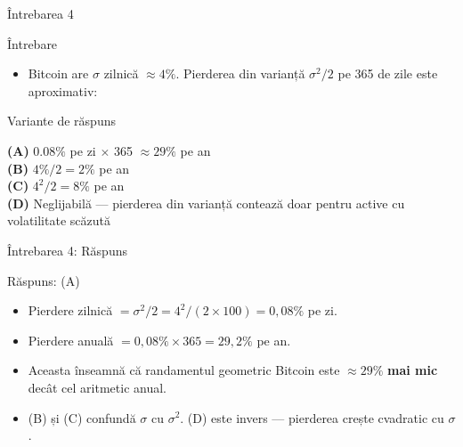 \documentclass[9pt, aspectratio=169, t]{beamer}
\theoremstyle{definition}
\newenvironment{cminipage}[1]{%
    \par\noindent\hfill\begin{minipage}{#1}\ignorespaces
}{%
    \end{minipage}\hfill\null\par
}
\begin{document}
\begin{frame}{Întrebarea 4}
    \begin{cminipage}{0.95\textwidth}
    \begin{alertblock}{Întrebare}
        \begin{itemize}
            \item Bitcoin are $\sigma$ zilnică $\approx 4\%$. Pierderea din varianță $\sigma^2/2$ pe 365 de zile este aproximativ:
        \end{itemize}
    \end{alertblock}

    \vspace{0.3cm}

    \begin{block}{Variante de răspuns}

        \textcolor{MainBlue}{\textbf{(A)}} $0.08\%$ pe zi $\times$ 365 $\approx 29\%$ pe an\\[3pt]

        \textcolor{MainBlue}{\textbf{(B)}} $4\%/2 = 2\%$ pe an\\[3pt]

        \textcolor{MainBlue}{\textbf{(C)}} $4^2/2 = 8\%$ pe an\\[3pt]

        \textcolor{MainBlue}{\textbf{(D)}} Neglijabilă --- pierderea din varianță contează doar pentru active cu volatilitate scăzută

    \end{block}
    \end{cminipage}
\end{frame}

\begin{frame}{Întrebarea 4: Răspuns}
    \begin{cminipage}{0.95\textwidth}
    \begin{exampleblock}{Răspuns: (A)}
    \begin{itemize}
        \item Pierdere zilnică $= \sigma^2/2 = 4^2/(2\times 100) = 0{,}08\%$ pe zi.
        \item Pierdere anuală $= 0{,}08\% \times 365 = 29{,}2\%$ pe an.
        \item Aceasta înseamnă că randamentul geometric Bitcoin este $\approx 29\%$ \textbf{mai mic} decât cel aritmetic anual.
        \item (B) și (C) confundă $\sigma$ cu $\sigma^2$. (D) este invers --- pierderea crește cvadratic cu $\sigma$.
    \end{itemize}
    \end{exampleblock}
    \end{cminipage}
\end{frame}
\end{document}
